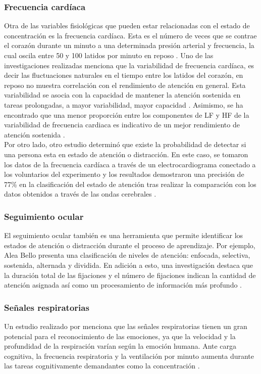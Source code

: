 \subsubsection{Frecuencia cardíaca}
\label{sec:frecuenciaC}
Otra de las variables fisiológicas que pueden estar relacionadas con el estado de concentración es la frecuencia cardíaca. Esta es el número de veces que se contrae el corazón durante un minuto a una determinada presión arterial y frecuencia, la cual oscila entre 50 y 100 latidos por minuto en reposo \autocite{2.frecuencia1}. Uno de las investigaciones realizadas menciona que la variabilidad de frecuencia cardíaca, es decir las fluctuaciones naturales en el tiempo entre los latidos del corazón, en reposo no muestra correlación con el rendimiento de atención en general. Esta variabilidad se asocia con la capacidad de mantener la atención sostenida en tareas prolongadas, a mayor variabilidad, mayor capacidad \autocite{2.frecuencia2}. Asimismo, se ha encontrado que una menor proporción entre los componentes de  \ac{LF} y  \ac{HF} de la variabilidad de frecuencia cardiaca es indicativo de un mejor rendimiento de atención sostenida \autocite{2.frecuencia3}.\\

Por otro lado,  otro estudio determinó que existe la probabilidad de detectar si una persona esta en estado de atención o distracción. En este caso, se tomaron los datos de la frecuencia cardíaca a través de un electrocardiograma conectado a los voluntarios del experimento y los resultados demostraron una precisión de 77\% en la clasificación del estado de atención tras realizar la comparación con los datos obtenidos a través de las ondas cerebrales \autocite{2.electrocardiograma}. 

\subsubsection{Seguimiento ocular}
El seguimiento ocular también es una herramienta que permite identificar los estados de atención o distracción durante el proceso de aprendizaje. Por ejemplo, Alea Bello \textcite{2.clasificacionOcular} presenta una clasificación de niveles de atención: enfocada, selectiva, sostenida, alternada y dividida. En adición a esto, una investigación destaca que la duración total de las fijaciones y el número de fijaciones indican la cantidad de atención asignada así como un procesamiento de información más profundo \autocite{2.ocular2}.

\subsubsection{Señales respiratorias}
Un estudio realizado por \textcite{2.Señalrespiracion1} menciona que las señales respiratorias tienen un gran potencial para el reconocimiento de las emociones, ya que la velocidad y la profundidad de la respiración varían según la emoción humana. Ante carga cognitiva, la frecuencia respiratoria y la ventilación por minuto aumenta durante las tareas cognitivamente demandantes como la concentración \autocite{2.Señalrespiracion2}.\\



